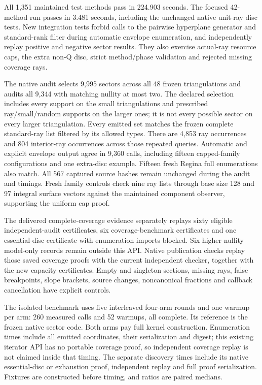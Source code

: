 All 1,351 maintained test methods pass in 224.903 seconds. The focused
42-method run passes in 3.481 seconds, including the unchanged native
unit-ray disc tests. New integration tests forbid calls to the pairwise
hyperplane generator and standard-rank filter during automatic envelope
enumeration, and independently replay positive and negative sector results.
They also exercise actual-ray resource caps, the extra non-Q disc, strict
method/phase validation and rejected missing coverage rays.

The native audit selects 9,995 sectors across all 48 frozen triangulations
and audits all 9,344 with matching nullity at most two. The declared
selection includes every support on the small triangulations and prescribed
ray/small/random supports on the larger ones; it is not every possible
sector on every larger triangulation. Every emitted set matches the frozen
complete standard-ray list filtered by its allowed types. There are 4,853
ray occurrences and 804 interior-ray occurrences across those repeated
queries. Automatic and explicit envelope output agree in 9,360 calls,
including fifteen capped-family configurations and one extra-disc example.
Fifteen fresh Regina full enumerations also match. All 567 captured source
hashes remain unchanged during the audit and timings. Fresh family controls
check nine ray lists through base size 128 and 97 integral surface vectors
against the maintained component observer, supporting the uniform cap proof.

The delivered complete-coverage evidence separately replays sixty eligible
independent-audit certificates, six coverage-benchmark certificates and one
essential-disc certificate with enumeration imports blocked. Six
higher-nullity model-only records remain outside this API. Native publication
checks replay those saved coverage proofs with the current independent
checker, together with the new capacity certificates. Empty and singleton
sections, missing rays, false breakpoints, slope brackets, source changes,
noncanonical fractions and callback cancellation have explicit controls.

The isolated benchmark uses five interleaved four-arm rounds and one warmup
per arm: 260 measured calls and 52 warmups, all complete. Its reference is
the frozen  native sector code. Both arms pay full kernel
construction. Enumeration times include all emitted coordinates, their
serialization and digest; this existing iterator API has no portable
coverage proof, so independent coverage replay is not claimed inside that
timing. The separate discovery times include its native essential-disc or
exhaustion proof, independent replay and full proof serialization. Fixtures
are constructed before timing, and ratios are paired medians.

